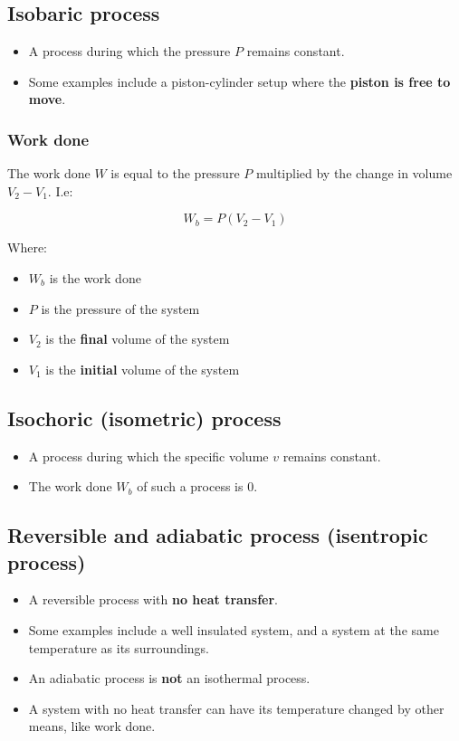\documentclass[11pt]{article}
\begin{document}
\subsection{Isobaric process}
\label{sec:org5754aea}
\begin{itemize}
\item A process during which the pressure \(P\) remains constant.
\item Some examples include a piston-cylinder setup where the \textbf{piston is free to move}.
\end{itemize}
\subsubsection{Work done}
\label{sec:org61bb1d5}
The work done \(W\) is equal to the pressure \(P\) multiplied by the change in volume \(V_2 - V_1\). I.e:

\[W_b = P \left(V_2 - V_1 \right)\]

Where:
\begin{itemize}
\item \(W_b\) is the work done
\item \(P\) is the pressure of the system
\item \(V_2\) is the \textbf{final} volume of the system
\item \(V_1\) is the \textbf{initial} volume of the system
\end{itemize}
\subsection{Isochoric (isometric) process}
\label{sec:orgd887b3e}
\begin{itemize}
\item A process during which the specific volume \(v\) remains constant.
\item The work done \(W_b\) of such a process is 0.
\end{itemize}
\subsection{Reversible and adiabatic process (isentropic process)}
\label{sec:org5dc66f6}
\begin{itemize}
\item A reversible process with \textbf{no heat transfer}.
\item Some examples include a well insulated system, and a system at the same temperature as its surroundings.
\item An adiabatic process is \textbf{not} an isothermal process.
\item A system with no heat transfer can have its temperature changed by other means, like work done.
\end{itemize}
\end{document}
